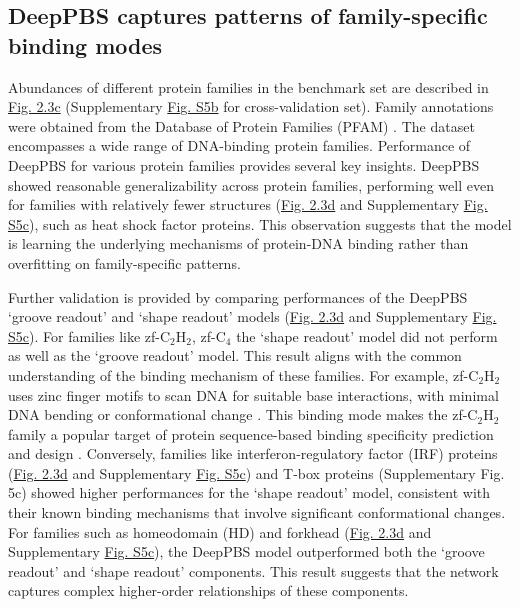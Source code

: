 \subsection{DeepPBS captures patterns of family-specific binding modes}
Abundances of different protein families in the benchmark set are described in \hyperref[fig:pdna2]{Fig. 2.3c} (Supplementary \hyperref[fig:pdnaS5]{Fig. S5b} for cross-validation set). Family annotations were obtained from the Database of Protein Families (PFAM) \citep{Mistry2021}. The dataset encompasses a wide range of DNA-binding protein families. Performance of DeepPBS for various protein families provides several key insights. DeepPBS showed reasonable generalizability across protein families, performing well even for families with relatively fewer structures (\hyperref[fig:pdna2]{Fig. 2.3d} and Supplementary \hyperref[fig:pdnaS5]{Fig. S5c}), such as heat shock factor proteins. This observation suggests that the model is learning the underlying mechanisms of protein-DNA binding rather than overfitting on family-specific patterns.
\par
Further validation is provided by comparing performances of the DeepPBS ‘groove readout’ and ‘shape readout’ models (\hyperref[fig:pdna2]{Fig. 2.3d} and Supplementary \hyperref[fig:pdnaS5]{Fig. S5c}). For families like zf-C$_2$H$_2$, zf-C$_4$ the ‘shape readout’ model did not perform as well as the ‘groove readout’ model. This result aligns with the common understanding of the binding mechanism of these families. For example, zf-C$_2$H$_2$ uses zinc finger motifs to scan DNA for suitable base interactions, with minimal DNA bending or conformational change \citep{Persikov2011}. This binding mode makes the zf-C$_2$H$_2$ family a popular target of protein sequence-based binding specificity prediction and design \citep{Persikov2014, persikov2009predicting, Sofia2022, Yanover2011, Ichikawa2023}. Conversely, families like interferon-regulatory factor (IRF) proteins (\hyperref[fig:pdna2]{Fig. 2.3d} and Supplementary \hyperref[fig:pdnaS5]{Fig. S5c}) and T-box proteins (Supplementary Fig. 5c) showed higher performances for the ‘shape readout’ model, consistent with their known binding mechanisms that involve significant conformational changes\citep{Stirnimann2010, Escalante1998}. For families such as homeodomain (HD) and forkhead (\hyperref[fig:pdna2]{Fig. 2.3d} and Supplementary \hyperref[fig:pdnaS5]{Fig. S5c}), the DeepPBS model outperformed both the ‘groove readout’ and ‘shape readout’ components. This result suggests that the network captures complex higher-order relationships of these components. 

